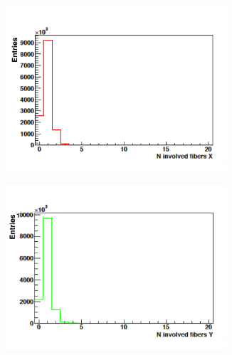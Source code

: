 \begin{figure}
\begin{subfigure}[b]{.5\textwidth}
\centering
\includegraphics[width=0.9\textwidth]{03_GraphicFiles/chapter6_BeamTests/Nice_May2018/clusterX.png}
\caption{}
\label{chap6::fig::May_HodoClusX}
\end{subfigure}
\begin{subfigure}[b]{.5\textwidth}
\centering
\includegraphics[width=0.9\textwidth]{03_GraphicFiles/chapter6_BeamTests/Nice_May2018/clusterY.png}	
\caption{}
\label{chap6::fig::May_HodoClusY}
\end{subfigure}
\caption{}
\label{chap6::fig::May_HodoClusters}
\end{figure}

